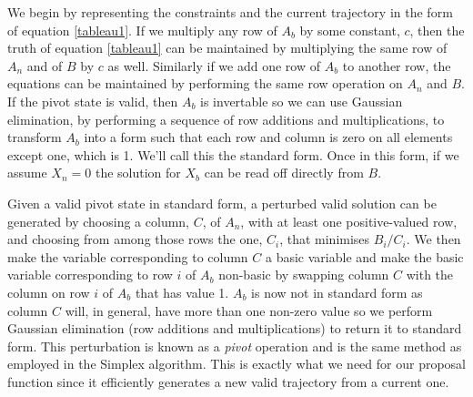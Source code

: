 \documentclass{article}
\begin{document}
We begin by representing the constraints and the current trajectory in the form of equation \ref{tableau1}. If we multiply any row of $A_b$ by some constant, $c$, then the truth of equation \ref{tableau1} can be maintained by multiplying the same row of $A_n$ and of $B$ by $c$ as well. Similarly if we add one row of $A_b$ to another row, the equations can be maintained by performing the same row operation on $A_n$ and $B$. If the pivot state is valid, then $A_b$ is invertable so we can use Gaussian elimination, by performing a sequence of row additions and multiplications, to transform $A_b$ into a form such that each row and column is zero on all elements except one, which is 1. We'll call this the standard form. Once in this form, if we assume $X_n = 0$ the solution for $X_b$ can be read off directly from $B$.

Given a valid pivot state in standard form, a perturbed valid solution can be generated by choosing a column, $C$, of $A_n$, with at least one positive-valued row, and choosing from among those rows the one, $C_i$, that minimises $B_i/C_i$. We then make the variable corresponding to column $C$ a basic variable and make the basic variable corresponding to row $i$ of $A_b$ non-basic by swapping column $C$ with the column on row $i$ of $A_b$ that has value 1. $A_b$ is now not in standard form as column $C$ will, in general, have more than one non-zero value so we perform Gaussian elimination (row additions and multiplications) to return it to standard form. This perturbation is known as a \textit{pivot} operation and is the same method as employed in the Simplex algorithm\cite{dantzig1955generalized}\cite{vanderbei2015linear}. This is exactly what we need for our proposal function since it efficiently generates a new valid trajectory from a current one.



\end{document}
